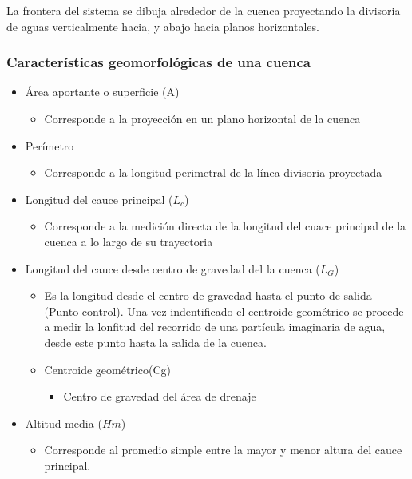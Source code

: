 La frontera del sistema se dibuja alrededor de la cuenca proyectando la divisoria de aguas verticalmente hacia, y abajo hacia planos horizontales.

\subsubsection{Características geomorfológicas de una cuenca}
\begin{itemize}
    \item Área aportante o superficie (A)
    \begin{itemize}
        \item Corresponde a la proyección en un plano horizontal de la cuenca
    \end{itemize}
    \item Perímetro
    \begin{itemize}
        \item Corresponde a la longitud perimetral de la línea divisoria proyectada
    \end{itemize}
    \item Longitud del cauce principal ($L_c$)
    \begin{itemize}
        \item Corresponde a la medición directa de  la longitud del cuace principal de la cuenca a lo largo de su trayectoria
    \end{itemize}
    \item Longitud del cauce desde centro de gravedad del la cuenca ($L_G$)
    \begin{itemize}
        \item Es la longitud desde el centro de gravedad hasta el punto de salida (Punto control). Una vez indentificado el centroide geométrico se procede a medir la lonfitud del recorrido de una partícula imaginaria de agua, desde este punto hasta la salida de la cuenca.
        \item Centroide geométrico(Cg)
        \begin{itemize}
            \item Centro de gravedad del área de drenaje
        \end{itemize}
    \end{itemize}
    \item Altitud media ($Hm$)
    \begin{itemize}
        \item Corresponde al promedio simple entre la mayor y menor altura del cauce principal.
    \end{itemize}

\end{itemize}
